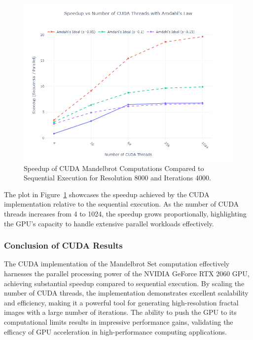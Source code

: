 \documentclass[
	report, %
	11pt, %
]{CSUniSchoolLabReport}
\newcounter{ct}
\begin{document}
\begin{figure}[H]
	\captionsetup{justification=centering, width=.8\linewidth}
	\centering
	\includegraphics[width=\textwidth]{./img/mandelbrot_cuda_speedup_vs_threads_amdahl.png}
	\caption{Speedup of CUDA Mandelbrot Computations Compared to Sequential Execution for Resolution 8000 and Iterations 4000.}
	\label{fig:mandelbrot_cuda_speedup_vs_threads_amdahl}
\end{figure}

The plot in Figure~\ref{fig:mandelbrot_cuda_speedup_vs_threads_amdahl} showcases the speedup achieved by the CUDA implementation relative to the sequential execution. As the number of CUDA threads increases from 4 to 1024, the speedup grows proportionally, highlighting the GPU's capacity to handle extensive parallel workloads effectively.

\subsubsection{Conclusion of CUDA Results}

The CUDA implementation of the Mandelbrot Set computation effectively harnesses the parallel processing power of the NVIDIA GeForce RTX 2060 GPU, achieving substantial speedup compared to sequential execution. By scaling the number of CUDA threads, the implementation demonstrates excellent scalability and efficiency, making it a powerful tool for generating high-resolution fractal images with a large number of iterations. The ability to push the GPU to its computational limits results in impressive performance gains, validating the efficacy of GPU acceleration in high-performance computing applications.
\end{document}
